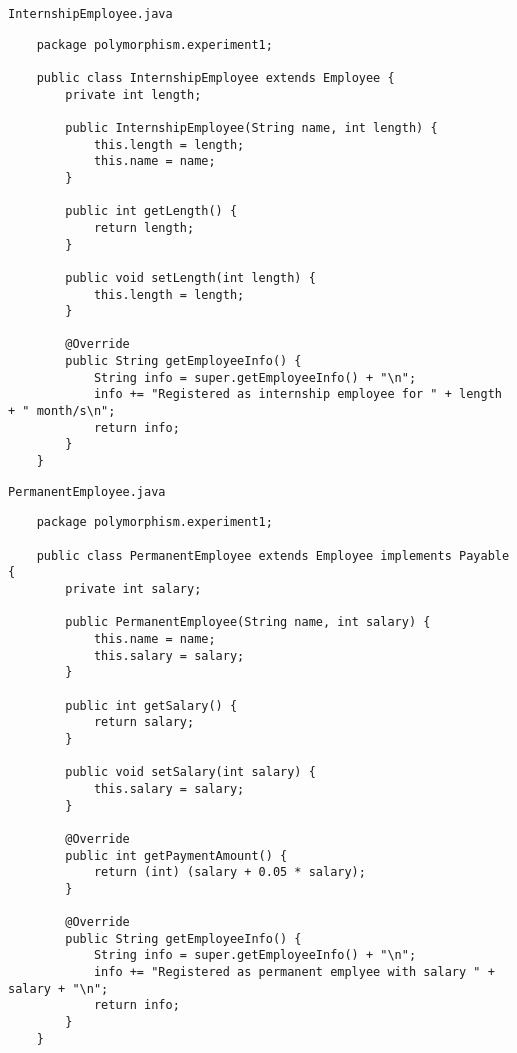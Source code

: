\documentclass[12pt,titlepage]{article}
\begin{document}
\texttt{InternshipEmployee.java}
\begin{verbatim}
    package polymorphism.experiment1;

    public class InternshipEmployee extends Employee {
        private int length;

        public InternshipEmployee(String name, int length) {
            this.length = length;
            this.name = name;
        }

        public int getLength() {
            return length;
        }

        public void setLength(int length) {
            this.length = length;
        }

        @Override
        public String getEmployeeInfo() {
            String info = super.getEmployeeInfo() + "\n";
            info += "Registered as internship employee for " + length + " month/s\n";
            return info;
        }
    }
\end{verbatim}

\texttt{PermanentEmployee.java}
\begin{verbatim}
    package polymorphism.experiment1;

    public class PermanentEmployee extends Employee implements Payable {
        private int salary;

        public PermanentEmployee(String name, int salary) {
            this.name = name;
            this.salary = salary;
        }

        public int getSalary() {
            return salary;
        }

        public void setSalary(int salary) {
            this.salary = salary;
        }

        @Override
        public int getPaymentAmount() {
            return (int) (salary + 0.05 * salary);
        }

        @Override
        public String getEmployeeInfo() {
            String info = super.getEmployeeInfo() + "\n";
            info += "Registered as permanent emplyee with salary " + salary + "\n";
            return info;
        }
    }
\end{verbatim}
\end{document}
